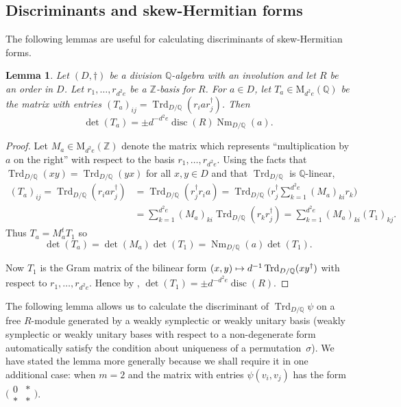 \documentclass[11pt]{article}
\numberwithin{equation}{section}
\def\mto{\mathchoice{\longmapsto}{\mapsto}{\mapsto}{\mapsto}}
\newcommand{\bQ}{\mathbb{Q}}
\newcommand{\bZ}{\mathbb{Z}}
\newcommand{\rM}{\mathrm{M}}
\DeclareMathOperator{\disc}{disc}
\DeclareMathOperator{\Nm}{Nm}
\DeclareMathOperator{\Trd}{Trd}
\newcommand{\fullsmallmatrix}[4]{\bigl( \begin{smallmatrix} #1 & #2 \\ #3 & #4 \end{smallmatrix} \bigr)}
\newtheorem{lemma}{Lemma}[section]
\begin{document}
\subsection{Discriminants and skew-Hermitian forms}

The following lemmas are useful for calculating discriminants of skew-Hermitian forms.

\begin{lemma} \label{disc-a-form}
Let $(D,\dag)$ be a division $\bQ$-algebra with an involution and let $R$ be an order in $D$.
Let $r_1, \dotsc, r_{d^2e}$ be a $\bZ$-basis for $R$.
For $a \in D$, let $T_a \in \rM_{d^2e}(\bQ)$ be the matrix with entries $(T_a)_{ij} = \Trd_{D/\bQ}(r_i a r_j^\dag)$.
Then\vspace*{-3pt}
\[
\det(T_a) = \pm d^{-d^2e} \disc(R) \Nm_{D/\bQ}(a).
\]
\end{lemma}

\begin{proof}
Let $M_a \in \rM_{d^2e}(\bZ)$ denote the matrix which represents ``multiplication by $a$ on the right'' with respect to the basis $r_1, \dotsc, r_{d^2e}$.
Using the facts that $\Trd_{D/\bQ}(xy) = \Trd_{D/\bQ}(yx)$ for all $x,y \in D$ and that $\Trd_{D/\bQ}$ is $\bQ$-linear,\vspace*{-3pt}
\begin{align*}
(T_a)_{ij}
= \Trd_{D/\bQ}(r_i a r_j^\dag)
& = \Trd_{D/\bQ}(r_j^\dag r_i a)
= \Trd_{D/\bQ} \bigl( r_j^\dag \textstyle\sum_{k=1}^{d^2e} (M_a)_{ki} r_k \bigr)
\\& = \sum_{k=1}^{d^2e}(M_a)_{ki} \Trd_{D/\bQ}(r_k r_j^\dag)
= \sum_{k=1}^{d^2e} (M_a)_{ki} (T_1)_{kj}.
\end{align*}
Thus $T_a = M_a^t T_1$ so\vspace*{-3pt}
\[
\det(T_a) = \det(M_a) \det(T_1) = \Nm_{D/\bQ}(a) \det(T_1).
\]

Now $T_1$ is the Gram matrix of the bilinear form $(x,y) \mto d^{-1}\Trd_{D/\bQ}(xy^\dag)$ with respect to $r_1, \dotsc, r_{d^2e}$.
Hence by \cite[Lem.\,5.6]{QRTUI}, $\det(T_1) = \pm d^{-d^2e} \disc(R)$.
\end{proof}

The following lemma allows us to calculate the discriminant of $\Trd_{D/\bQ} \psi$ on a free $R$-module generated by a weakly symplectic or weakly unitary basis (weakly symplectic or weakly unitary bases with respect to a non-degenerate form automatically satisfy the condition about uniqueness of a permutation~$\sigma$).
We have stated the lemma more generally because we shall require it in one additional case: when $m=2$ and the matrix with entries $\psi(v_i, v_j)$ has the form $\fullsmallmatrix{0}{*}{*}{*}$.
\end{document}
